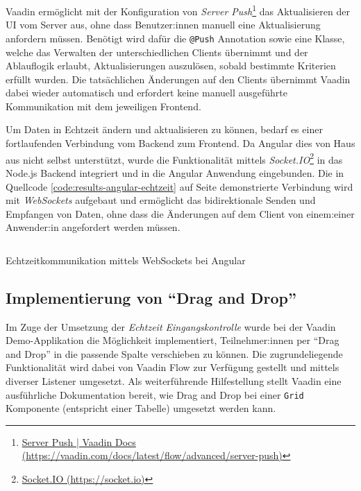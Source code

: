 \documentclass[a4paper,12pt,twoside]{scrreprt}
\begin{document}
\medskip

Vaadin ermöglicht mit der Konfiguration von \textit{Server Push}\footnote{\href{https://vaadin.com/docs/latest/flow/advanced/server-push}{Server Push | Vaadin Docs (https://vaadin.com/docs/latest/flow/advanced/server-push)}} das Aktualisieren der \ac{UI} vom Server aus, ohne dass Benutzer:innen manuell eine Aktualisierung anfordern müssen. Benötigt wird dafür die \texttt{@Push} Annotation sowie eine Klasse, welche das Verwalten der unterschiedlichen Clients übernimmt und der Ablauflogik erlaubt, Aktualisierungen auszulösen, sobald bestimmte Kriterien erfüllt wurden. Die tatsächlichen Änderungen auf den Clients übernimmt Vaadin dabei wieder automatisch und erfordert keine manuell ausgeführte Kommunikation mit dem jeweiligen Frontend.

\medskip

Um Daten in Echtzeit ändern und aktualisieren zu können, bedarf es einer fortlaufenden Verbindung vom Backend zum Frontend. Da Angular dies von Haus aus nicht selbst unterstützt, wurde die Funktionalität mittels \textit{Socket.IO}\footnote{\href{https://socket.io/}{Socket.IO (https://socket.io)}} in das Node.js Backend integriert und in die Angular Anwendung eingebunden. Die in Quellcode \ref{code:results-angular-echtzeit} auf Seite \pageref{code:results-angular-echtzeit} demonstrierte Verbindung wird mit \textit{WebSockets} aufgebaut und ermöglicht das bidirektionale Senden und Empfangen von Daten, ohne dass die Änderungen auf dem Client von einem:einer Anwender:in angefordert werden müssen.

\begin{listing}[ht]
    \inputminted[fontsize=\footnotesize,linenos,breaklines]{js}{code/Luidold_Results-Angular-Echtzeit-CodeSample.ts}
    \caption[Echtzeitkommunikation mittels WebSockets bei Angular]{Echtzeitkommunikation mittels WebSockets bei Angular}
    \label{code:results-angular-echtzeit}
\end{listing}

\subsection{Implementierung von \enquote{Drag and Drop}}
\label{sub-sec:results-user-stories-drag-drop}
Im Zuge der Umsetzung der \textit{Echtzeit Eingangskontrolle} wurde bei der Vaadin Demo-Applikation die Möglichkeit implementiert, Teilnehmer:innen per \enquote{Drag and Drop} in die passende Spalte verschieben zu können. Die zugrundeliegende Funktionalität wird dabei von Vaadin Flow zur Verfügung gestellt und mittels diverser Listener umgesetzt. Als weiterführende Hilfestellung stellt Vaadin eine ausführliche Dokumentation bereit, wie Drag and Drop bei einer \texttt{Grid} Komponente (entspricht einer Tabelle) umgesetzt werden kann.
\end{document}
